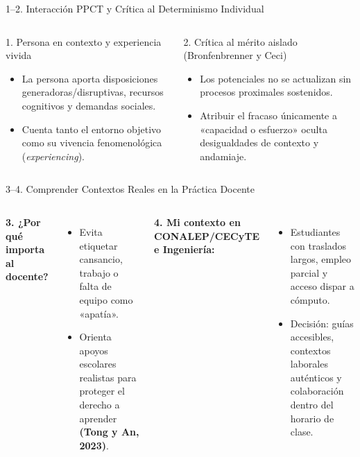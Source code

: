 \documentclass[aspectratio=169,spanish,xcolor=table]{beamer}
\begin{document}
\begin{frame}{1--2. Interacción PPCT y Crítica al Determinismo Individual}
  \begin{columns}[T]
      \begin{block}{1. Persona en contexto y experiencia vivida}
        \scriptsize
        \begin{itemize}
          \item La persona aporta disposiciones generadoras/disruptivas, recursos cognitivos y demandas sociales.
          \item Cuenta tanto el entorno objetivo como su vivencia fenomenológica (\textit{experiencing}).
        \end{itemize}
      \end{block}
      \begin{block}{2. Crítica al mérito aislado (Bronfenbrenner y Ceci)}
        \scriptsize
        \begin{itemize}
          \item Los potenciales no se actualizan sin procesos proximales sostenidos.
          \item Atribuir el fracaso únicamente a «capacidad o esfuerzo» oculta desigualdades de contexto y andamiaje.
        \end{itemize}
      \end{block}
  \end{columns}
\end{frame}

\begin{frame}{3--4. Comprender Contextos Reales en la Práctica Docente}
  \begin{columns}[T]
      \textbf{\color{iiiepeNavy}3. ¿Por qué importa al docente?}
      \begin{itemize}\scriptsize
        \item Evita etiquetar cansancio, trabajo o falta de equipo como «apatía».
        \item Orienta apoyos escolares realistas para proteger el derecho a aprender \textbf{(Tong y An, 2023)}.
      \end{itemize}
      \textbf{\color{iiiepeBlue}4. Mi contexto en CONALEP/CECyTE e Ingeniería:}
      \begin{itemize}\scriptsize
        \item Estudiantes con traslados largos, empleo parcial y acceso dispar a cómputo.
        \item Decisión: guías accesibles, contextos laborales auténticos y colaboración dentro del horario de clase.
      \end{itemize}
  \end{columns}
\end{frame}
\end{document}
